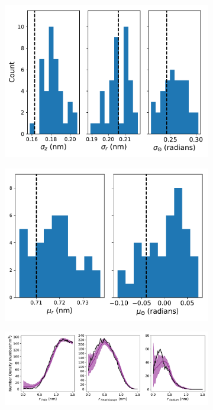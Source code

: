 \documentclass[journal=jpcbfk,manuscript=article]{achemso}
\begin{document}
  \begin{figure}[!htb]
  \centering
  \begin{subfigure}{0.49\textwidth}
  \includegraphics[width=\textwidth]{offset_ensemble_stds.pdf}
  \caption{}\label{fig:offset_ensemble_stds}
  \end{subfigure}
  \begin{subfigure}{0.49\textwidth}
  \includegraphics[width=\textwidth]{offset_ensemble_means.pdf}
  \caption{}\label{fig:offset_ensemble_means}
  \end{subfigure}
  \begin{subfigure}{\textwidth}
  \includegraphics[width=\textwidth]{offset_ensemble_regional_density.pdf}

\end{subfigure}
\end{figure}
\end{document}
